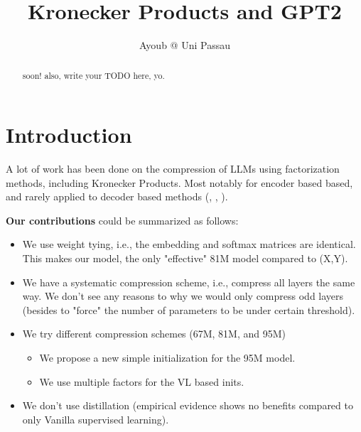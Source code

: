 \documentclass{article}
\title{Kronecker Products and GPT2}
\author{Ayoub @ Uni Passau}
\begin{document}
\maketitle

\begin{abstract}
soon! also, write your TODO here, yo.
\end{abstract}

\newpage

\tableofcontents
\newpage



\section{Introduction}
\label{sec:Introduction}


A lot of work has been done on the compression of LLMs using factorization methods, including Kronecker Products. Most notably for encoder based based, and rarely applied to decoder based methods (\cite{tahaei2022kroneckerbert}, \cite{edalati2021kroneckr}, \cite{abronin2024tqcompressor}).

\begin{comment}

We study how far we can push the compression ratio, and record then impact of down-scaling on the quality of the model. We also investigate adding multiple Kronecker factors.

In this work we demonstrate the effectiveness of freezing, and of slow integration of weights, either through training or distillation.
\end{comment}

\textbf{Our contributions} could be summarized as follows:
\begin{itemize}
    \item We use weight tying, i.e., the embedding and softmax matrices are identical. This makes our model, the only "effective" 81M model compared to (X,Y).
    \item We have a systematic compression scheme, i.e., compress all layers the same way. We don't see any reasons to why we would only compress odd layers (besides to "force" the number of parameters to be under certain threshold).
    \item We try different compression schemes (67M, 81M, and 95M)
		\begin{itemize}
			\item We propose a new simple initialization for the 95M model.
			\item We use multiple factors for the VL based inits.
		\end{itemize}
    \item We don't use distillation (empirical evidence shows no benefits compared to only Vanilla supervised learning).
\end{itemize}
\end{document}
